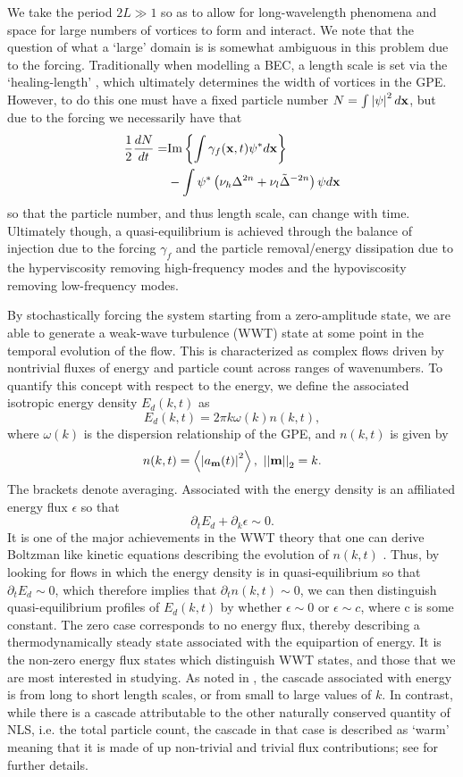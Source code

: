 \documentclass[aps,prl,preprint,groupedaddress]{revtex4-1}
\newcommand{\pd}{\partial}
\newcommand{\gnorm}[1]{\left|\left| #1\right|\right|}
\begin{document}
We take the period $2L\gg 1$ so as to allow for long-wavelength phenomena and space for large numbers of vortices to form and interact.  We note that the question of what a `large' domain is is somewhat ambiguous in this problem due to the forcing.  Traditionally when modelling a BEC, a length scale is set via the `healing-length' \cite{pethick}, which ultimately determines the width of vortices in the GPE.  However, to do this one must have a fixed particle number $N= \int \left|\psi\right|^{2}d{\bf x}$, but due to the forcing we necessarily have that 
\begin{align*}
\frac{1}{2}\frac{dN}{dt} = &  \mbox{Im}\left\{\int \gamma_{f}({\bf x},t) \psi^{\ast} d{\bf x} \right\}\\
& - \int \psi^{\ast}\left(\nu_{h}\Delta^{2n}+\nu_{l}\tilde{\Delta}^{-2n}\right)\psi d{\bf x}
\end{align*}
so that the particle number, and thus length scale, can change with time.  Ultimately though, a quasi-equilibrium is achieved through the balance of injection due to the forcing $\gamma_{f}$ and the particle removal/energy dissipation due to the hyperviscosity removing high-frequency modes and the hypoviscosity removing low-frequency modes.  

By stochastically forcing the system starting from a zero-amplitude state, we are able to generate a weak-wave turbulence (WWT) state at some point in the temporal evolution of the flow. 
This is characterized as complex flows driven by nontrivial fluxes of energy and particle count across ranges of wavenumbers.  To quantify this concept with respect to the energy, we define the associated isotropic energy density $E_{d}(k,t)$ as
\[
E_{d}(k,t) = 2\pi k\omega(k)n(k,t), 
\]
where $\omega(k)$ is the dispersion relationship of the GPE, and $n(k,t)$ is given by 
\[
n(k,t) = \left< \left|a_{{\bf m}}(t)\right|^{2}\right>, ~ \gnorm{{\bf m}}_{2} = k.
\]
The brackets denote averaging.  Associated with the energy density is an affiliated energy flux $\epsilon$ so that 
\[
\pd_{t} E_{d} + \pd_{k}\epsilon \sim 0.
\]
It is one of the major achievements in the WWT theory that one can derive Boltzman like kinetic equations describing the evolution of $n(k,t)$ \cite{nazarenko}.  Thus, by looking for flows in which the energy density is in quasi-equilibrium so that $\pd_{t}E_{d}\sim 0$, which therefore implies that $\pd_{t}n(k,t)\sim 0$, we can then distinguish quasi-equilibrium profiles of $E_{d}(k,t)$ by whether $\epsilon \sim 0$ or $\epsilon \sim c$, where c is some constant.  The zero case corresponds to no energy flux, thereby describing a thermodynamically steady state associated with the equipartion of energy.  It is the non-zero energy flux states which distinguish WWT states, and those that we are most interested in studying.  As noted in \cite{nazarenko}, the cascade associated with energy is from long to short length scales, or from small to large values of $k$.  In contrast, while there is a cascade attributable to the other naturally conserved quantity of NLS, i.e. the total particle count, the cascade in that case is described as `warm' meaning that it is made of up non-trivial and trivial flux contributions; see \cite{nazarenko} for further details.
\end{document}
